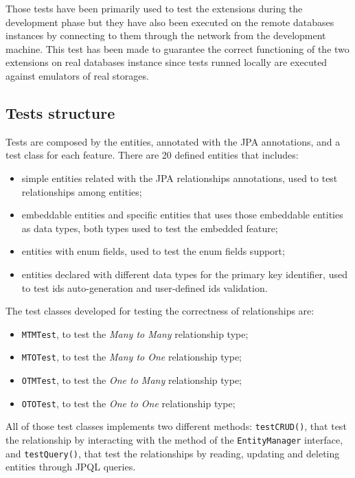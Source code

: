 \noindent Those tests have been primarily used to test the extensions during the development phase but they have also been executed on the remote databases instances by connecting to them through the network from the development machine. This test has been made to guarantee the correct functioning of the two extensions on real databases instance since tests runned locally are executed  against emulators of real storages.

\subsection{Tests structure}
Tests are composed by the entities, annotated with the JPA annotations, and a test class for each feature.
There are 20 defined entities that includes:
\begin{itemize}
\item simple entities related with the JPA relationships annotations, used to test relationships among entities;
\item embeddable entities and specific entities that uses those embeddable entities as data types, both types used to test the embedded feature;
\item entities with enum fields, used to test the enum fields support;
\item entities declared with different data types for the primary key identifier, used to test ids auto-generation and user-defined ids validation.
\end{itemize}

\noindent The test classes developed for testing the correctness of relationships are:
\begin{itemize}
\item \texttt{MTMTest}, to test the \textit{Many to Many} relationship type;
\item \texttt{MTOTest}, to test the \textit{Many to One} relationship type;
\item \texttt{OTMTest}, to test the \textit{One to Many} relationship type;
\item \texttt{OTOTest}, to test the \textit{One to One} relationship type;
\end{itemize}
\noindent All of those test classes implements two different methods: \texttt{testCRUD()}, that test the relationship by interacting with the method of the \texttt{EntityManager} interface, and \texttt{testQuery()}, that test the relationships by reading, updating and deleting entities through JPQL queries.

